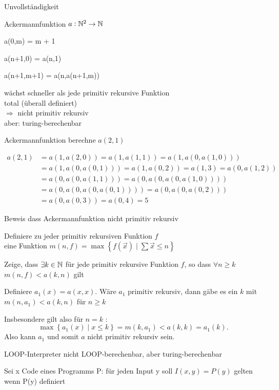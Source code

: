 \begin{concept}{Unvollständigkeit} 

    \begin{minipage}{0.5\linewidth}   
    Ackermannfunktion $a: \mathbb{N}^2 \rightarrow \mathbb{N}$ 
    
    a(0,m) = m + 1

    a(n+1,0) = a(n,1)

    a(n+1,m+1) = a(n,a(n+1,m))
    \end{minipage}
    \begin{minipage}{0.49\linewidth}
    {\footnotesize wächst schneller als jede primitiv rekursive Funktion\\
    total (überall definiert)\\
    $\Rightarrow$ nicht primitiv rekursiv\\
    aber: turing-berechenbar}
    \end{minipage}    
\end{concept}

\begin{example2}{Ackermannfunktion} berechne $a(2,1)$

    $
    \begin{aligned}
    a(2,1) & =a(1, a(2,0))=a(1, a(1,1))=a(1, a(0, a(1,0))) \\
    & =a(1, a(0, a(0,1)))=a(1, a(0,2))=a(1,3)=a(0, a(1,2)) \\
    & =a(0, a(0, a(1,1)))=a(0, a(0, a(0, a(1,0)))) \\
    & =a(0, a(0, a(0, a(0,1))))=a(0, a(0, a(0,2))) \\
    & =a(0, a(0,3))=a(0,4)=5
    \end{aligned}
    $
\end{example2}

\begin{example2}{Beweis dass Ackermannfunktion nicht primitiv rekursiv}

    Definiere zu jeder primitiv rekursiven Funktion $f$ \\eine Funktion $m(n, f)=\max \left\{f(\vec{x}) \mid \sum \vec{x} \leq n\right\}$
    
    Zeige, dass $\exists k \in \mathbb{N}$ für jede primitiv rekursive Funktion $f$, so dass $\forall n \geq k$  $m(n, f)<a(k, n)$ gilt
    
    Definiere $a_1(x)=a(x, x)$. Wäre $a_1$ primitiv rekursiv, dann gäbe es ein $k$ mit $m\left(n, a_1\right)<a(k, n)$ für $n \geq k$
    
    Insbesondere gilt also für $n=k$ :
    $$
    \max \left\{a_1(x) \mid x \leq k\right\}=m\left(k, a_1\right)<a(k, k)=a_1(k) .
    $$
    Also kann $a_1$ und somit $a$ nicht primitiv rekursiv sein. 
\end{example2}

\begin{concept}{LOOP-Interpreter} nicht LOOP-berechenbar, aber turing-berechenbar

    Sei x Code eines Programms P: für jeden Input y soll $I(x,y) = P(y)$ gelten {\footnotesize wenn P(y) definiert}
\end{concept}









